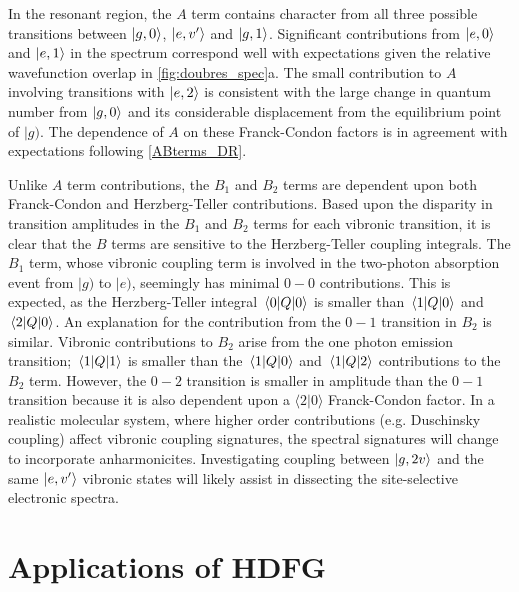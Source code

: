 \documentclass[aip, jcp, reprint, onecolumn]{revtex4-2}
\begin{document}
In the resonant region, the $A$ term contains character from all three possible transitions between $\ket{g,0}$, $\ket{e,v'}$ and $\ket{g,1}$. 
Significant contributions from $\ket{e,0}$ and $\ket{e,1}$ in the spectrum correspond well with expectations given the relative wavefunction overlap in \autoref{fig:doubres_spec}a. 
The small contribution to $A$ involving transitions with $\ket{e,2}$ is consistent with the large change in quantum number from $\ket{g,0}$ and its considerable displacement from the equilibrium point of $|g)$.
The dependence of $A$ on these Franck-Condon factors is in agreement with expectations following \autoref{ABterms_DR}. 

Unlike $A$ term contributions, the $B_1$ and $B_2$ terms are dependent upon both Franck-Condon and Herzberg-Teller contributions.
Based upon the disparity in transition amplitudes in the $B_1$ and $B_2$ terms for each vibronic transition, it is clear that the $B$ terms are sensitive to the Herzberg-Teller coupling integrals.
The $B_1$ term, whose vibronic coupling term is involved in the two-photon absorption event from $|g)$ to $|e)$, seemingly has minimal $0-0$ contributions. 
This is expected, as the Herzberg-Teller integral $\mel{0}{Q}{0}$ is smaller than $\mel{1}{Q}{0}$ and $\mel{2}{Q}{0}$. 
An explanation for the contribution from the $0-1$ transition in $B_2$ is similar.
Vibronic contributions to $B_2$ arise from the one photon emission transition; $\mel{1}{Q}{1}$ is smaller than the $\mel{1}{Q}{0}$ and $\mel{1}{Q}{2}$ contributions to the $B_2$ term.
However, the $0-2$ transition is smaller in amplitude than the $0-1$ transition because it is also dependent upon a $\langle 2 | 0 \rangle$ Franck-Condon factor.
In a realistic molecular system, where higher order contributions (e.g. Duschinsky coupling) affect vibronic coupling signatures, the spectral signatures will change to incorporate anharmonicites. \cite{Duschinsky1937, Carlson1990, Kundu2022}
Investigating coupling between $\ket{g,2v}$ and the same $\ket{e,v'}$ vibronic states will likely assist in dissecting the site-selective electronic spectra.

\section{Applications of HDFG}\label{quant}
\end{document}
